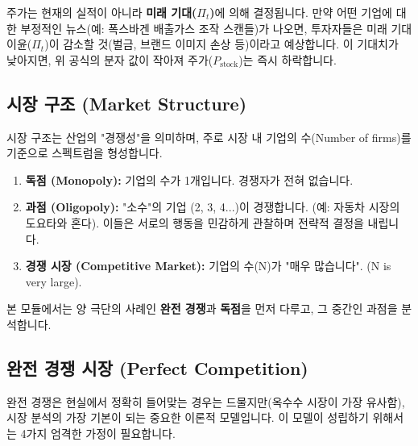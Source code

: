 \documentclass[11pt,a4paper]{book}
\theoremstyle{definition}
\begin{document}
주가는 현재의 실적이 아니라 \textbf{미래 기대($\Pi_t$)}에 의해 결정됩니다.
만약 어떤 기업에 대한 부정적인 뉴스(예: 폭스바겐 배출가스 조작 스캔들)가 나오면,
투자자들은 미래 기대 이윤($\Pi_t$)이 감소할 것(벌금, 브랜드 이미지 손상 등)이라고 예상합니다.
이 기대치가 낮아지면, 위 공식의 분자 값이 작아져 주가($P_{\text{stock}}$)는 즉시 하락합니다.

\subsection{시장 구조 (Market Structure)}

시장 구조는 산업의 "경쟁성"을 의미하며, 주로 시장 내 기업의 수(Number of firms)를 기준으로 스펙트럼을 형성합니다.

\begin{enumerate}
    \item \textbf{독점 (Monopoly):} 기업의 수가 1개입니다. 경쟁자가 전혀 없습니다.
    \item \textbf{과점 (Oligopoly):} "소수"의 기업 (2, 3, 4...)이 경쟁합니다. (예: 자동차 시장의 도요타와 혼다). 이들은 서로의 행동을 민감하게 관찰하며 전략적 결정을 내립니다.
    \item \textbf{경쟁 시장 (Competitive Market):} 기업의 수(N)가 "매우 많습니다". (N is very large).
\end{enumerate}

본 모듈에서는 양 극단의 사례인 \textbf{완전 경쟁}과 \textbf{독점}을 먼저 다루고, 그 중간인 과점을 분석합니다.

\subsection{완전 경쟁 시장 (Perfect Competition)}

완전 경쟁은 현실에서 정확히 들어맞는 경우는 드물지만(옥수수 시장이 가장 유사함), 시장 분석의 가장 기본이 되는 중요한 이론적 모델입니다. 이 모델이 성립하기 위해서는 4가지 엄격한 가정이 필요합니다.
\end{document}
